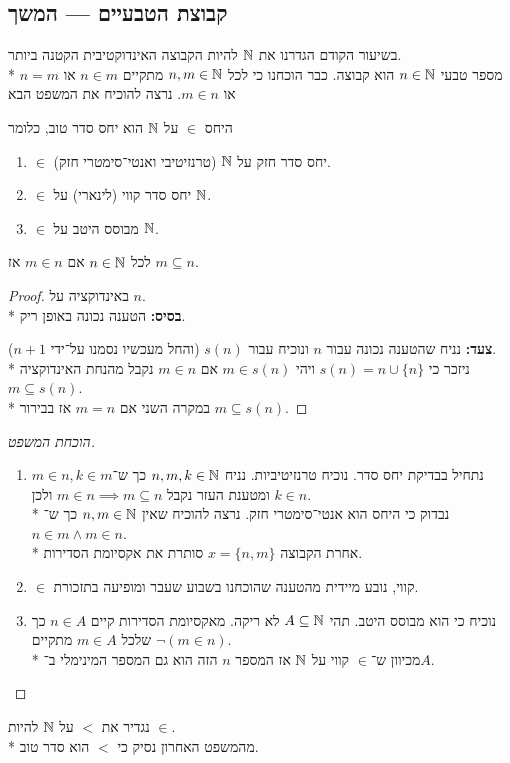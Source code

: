 \subsection{קבוצת הטבעיים --- המשך}
בשיעור הקודם הגדרנו את $\mathbb{N}$ להיות הקבוצה האינדוקטיבית הקטנה ביותר. \\*
מספר טבעי $n \in \mathbb{N}$ הוא קבוצה.
כבר הוכחנו כי לכל $n, m \in \mathbb{N}$ מתקיים $n \in m$ או $n = m$ או $m \in n$.
נרצה להוכיח את המשפט הבא
\begin{theorem}
	היחס $\in$ על $\mathbb{N}$ הוא יחס סדר טוב, כלומר
	\begin{enumerate}
		\item $\in$ יחס סדר חזק על $\mathbb{N}$ (טרנזיטיבי ואנטי־סימטרי חזק).
		\item $\in$ יחס סדר קווי (לינארי) על $\mathbb{N}$.
		\item $\in$ מבוסס היטב על $\mathbb{N}$.
	\end{enumerate}
\end{theorem}
\begin{proposition}
	לכל $n \in \mathbb{N}$ אם $m \in n$ אז $m \subseteq n$.
\end{proposition}
\begin{proof}
	באינדוקציה על $n$. \\*
	\textbf{בסיס:}
	הטענה נכונה באופן ריק.

	\textbf{צעד:}
	נניח שהטענה נכונה עבור $n$ ונוכיח עבור $s(n)$ (והחל מעכשיו נסמנו על־ידי $n + 1$). \\*
	ניזכר כי $s(n) = n \cup \{n\}$ ויהי $m \in s(n)$ אם $m \in n$ נקבל מהנחת האינדוקציה $m \subseteq s(n)$. \\*
	במקרה השני אם $m = n$ אז בבירור $m \subseteq s(n)$.
\end{proof}
\begin{proof}[הוכחת המשפט]
	\begin{enumerate}
		\item נתחיל בבדיקת יחס סדר. נוכיח טרנזיטיביות.
			נניח $n, m, k \in \mathbb{N}$ כך ש־$m \in n, k \in m$ ומטענת העזר נקבל $m \in n \implies m \subseteq n$ ולכן $k \in n$. \\*
			נבדוק כי היחס הוא אנטי־סימטרי חזק. נרצה להוכיח שאין $n, m \in \mathbb{N}$ כך ש־$n \in m \land m \in n$. \\*
			אחרת הקבוצה $x = \{n, m\}$ סותרת את אקסיומת הסדירות.
		\item $\in$ קווי, נובע מיידית מהטענה שהוכחנו בשבוע שעבר ומופיעה בתזכורת.
		\item נוכיח כי הוא מבוסס היטב. תהי $A \subseteq \mathbb{N}$ לא ריקה. מאקסיומת הסדירות קיים $n \in A$ כך שלכל $m \in A$ מתקיים $\lnot(m \in n)$. \\*
			מכיוון ש־$\in$ קווי על $\mathbb{N}$ אז המספר $n$ הזה הוא גם המספר המינימלי ב־$A$.
	\end{enumerate}
\end{proof}
\begin{definition}
	נגדיר את $<$ על $\mathbb{N}$ להיות $\in$. \\*
	מהמשפט האחרון נסיק כי $<$ הוא סדר טוב.
\end{definition}

